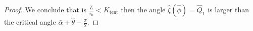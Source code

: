 \documentclass[reqno]{amsart}
\newcounter{assu}
\theoremstyle{definition} \newtheorem{definition}{Definition}[section]
\theoremstyle{definition} \newtheorem{remark}[definition]{Remark}
\theoremstyle{plain} \newtheorem{lemma}[definition]{Lemma}
\theoremstyle{plain} \newtheorem{proposition}[definition]{Proposition}
\theoremstyle{plain} \newtheorem{theorem}[definition]{Theorem}
\theoremstyle{plain} \newtheorem{corollary}[definition]{Corollary}
\theoremstyle{definition} \newtheorem{example}[definition]{Example}
\theoremstyle{plain} \newtheorem{claim}[clai]{Claim}
\theoremstyle{definition} \newtheorem{assumption}[definition]{Assumption}
\theoremstyle{definition} \newtheorem{observation}[definition]{Observation}
\newcommand{\R}{\mathbb{R}}
\newcommand{\1}{\mathbbm 1}
\renewcommand{\i}{\imath}
\numberwithin{equation}{section} %
\theoremstyle{plain} \newtheorem*{theorem*}{Theorem}
\theoremstyle{plain} \newtheorem{mthm}[maintheorem]{Main Theorem}
\theoremstyle{plain} \newtheorem*{mthm*}{Main Theorem}
\theoremstyle{plain} \newtheorem*{conjecture*}{Conjecture}
\theoremstyle{plain} \newtheorem{conjecture}[definition]{Conjecture}
\theoremstyle{plain} \newtheorem*{problem*}{Problem}
\begin{document}
\begin{proof}
We conclude that is $\frac{\hat L}{\hat r_0} < K_\mathrm{tent}$ then the angle $\hat \zeta(\hat \phi) = \hat Q_1$ is larger than the critical angle $\bar \alpha + \hat \theta - \frac{\pi}{2}$.
%
%
%
%
%
%

\end{proof}
\end{document}
